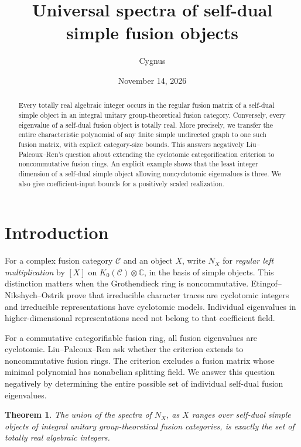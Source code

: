 \documentclass[11pt]{amsart}
\title{Universal spectra of self-dual simple fusion objects}
\author{Cygnus}
\date{November 14, 2026}
\newtheorem{theorem}{Theorem}[section]
\theoremstyle{remark}
\newcommand{\C}{\mathbb C}
\begin{document}
\begin{abstract}
Every totally real algebraic integer occurs in the regular fusion matrix
of a self-dual simple object in an integral unitary group-theoretical fusion
category. Conversely, every eigenvalue of a self-dual fusion object is
totally real. More precisely, we transfer the entire characteristic polynomial
of any finite simple undirected graph to one such fusion matrix, with explicit
category-size bounds. This answers negatively Liu--Palcoux--Ren's question
about extending the cyclotomic categorification criterion to noncommutative
fusion rings. An explicit example shows that the least integer dimension of a self-dual
simple object allowing noncyclotomic eigenvalues is three. We also give
coefficient-input bounds for a positively scaled realization.
\end{abstract}
\maketitle

\section{Introduction}

For a complex fusion category $\mathcal C$ and an object $X$, write $N_X$
for \emph{regular left multiplication} by $[X]$ on $K_0(\mathcal C)\otimes\C$,
in the basis of simple objects. This distinction matters when the
Grothendieck ring is noncommutative. Etingof--Nikshych--Ostrik
\cite[Theorem 8.51 and Corollary 8.53]{ENO} prove that irreducible character
traces are cyclotomic integers and irreducible representations have
cyclotomic models. Individual eigenvalues in higher-dimensional
representations need not belong to that coefficient field.

For a commutative categorifiable fusion ring, all fusion eigenvalues are
cyclotomic. Liu--Palcoux--Ren \cite[Theorem 2.11 and Question 2.12]{LPR}
ask whether the criterion extends to noncommutative fusion rings.
The criterion excludes a fusion matrix whose minimal polynomial has
nonabelian splitting field. We answer this question negatively by determining the entire
possible set of individual self-dual fusion eigenvalues.

\begin{theorem}\label{thm:universal}
The union of the spectra of $N_X$, as $X$ ranges over self-dual simple
objects of integral unitary group-theoretical fusion categories, is exactly
the set of totally real algebraic integers.
\end{theorem}
\end{document}
